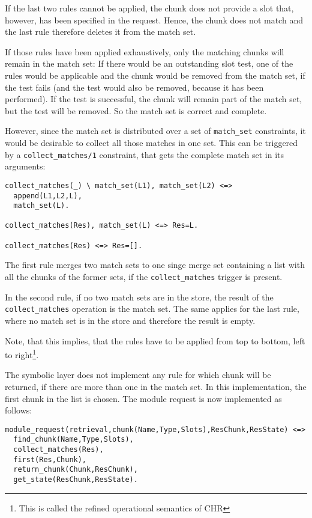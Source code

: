If the last two rules cannot be applied, the chunk does not provide a slot that, however, has been specified in the request. Hence, the chunk does not match and the last rule therefore deletes it from the match set. 

If those rules have been applied exhaustively, only the matching chunks will remain in the match set: If there would be an outstanding slot test, one of the rules would be applicable and the chunk would be removed from the match set, if the test fails (and the test would also be removed, because it has been performed). If the test is successful, the chunk will remain part of the match set, but the test will be removed. So the match set is correct and complete.

However, since the match set is distributed over a set of \verb|match_set| constraints, it would be desirable to collect all those matches in one set. This can be triggered by a \verb|collect_matches/1| constraint, that gets the complete match set in its arguments:

\begin{lstlisting}
collect_matches(_) \ match_set(L1), match_set(L2) <=> 
  append(L1,L2,L), 
  match_set(L).
  
collect_matches(Res), match_set(L) <=> Res=L.

collect_matches(Res) <=> Res=[].
\end{lstlisting}

The first rule merges two match sets to one singe merge set containing a list with all the chunks of the former sets, if the \verb|collect_matches| trigger is present. 

In the second rule, if no two match sets are in the store, the result of the \verb|collect_matches| operation is the match set. The same applies for the last rule, where no match set is in the store and therefore the result is empty.

Note, that this implies, that the rules have to be applied from top to bottom, left to right\footnote{This is called the refined operational semantics of CHR}.

The symbolic layer does not implement any rule for which chunk will be returned, if there are more than one in the match set. In this implementation, the first chunk in the list is chosen. The module request is now implemented as follows:

\begin{lstlisting}
module_request(retrieval,chunk(Name,Type,Slots),ResChunk,ResState) <=> 
  find_chunk(Name,Type,Slots),
  collect_matches(Res),
  first(Res,Chunk),
  return_chunk(Chunk,ResChunk),
  get_state(ResChunk,ResState).
\end{lstlisting}

